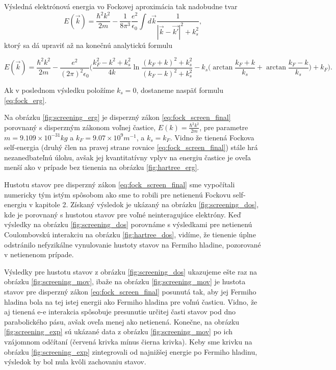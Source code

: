 Výsledná elektrónová energia vo Fockovej aproximácia tak nadobudne tvar
 \begin{equation}
  \label{eq:fock_screen}
  E(\vec{k})=\frac{\hbar^2 k^2}{2m} - \frac{1}{8\pi^3}  \frac{e^2}{\epsilon_0}  \int d\vec{k} \frac{1}{|\vec{k}-\vec{k'}|^2+k_s^2} \text{,}
 \end{equation}
 ktorý sa dá upraviť až na konečnú analytickú formulu
 
 
 
 
 
 

 \begin{equation}
  \label{eq:fock_screen_final}
  E(\vec{k})=\frac{\hbar^2 k^2} {2m} - \frac{e^2}{(2\pi)^2\epsilon_0} \biggl(
    \frac{k_F^2-k^2+k_s^2}{4k} \ln{\frac{(k_F+k)^2+k_s^2}{(k_F-k)^2+k_s^2}}-k_s\bigl(\arctan{\frac{k_F+k}{k_s}}+\arctan{\frac{k_F-k}{k_s}}\bigr)+k_F\biggr) \text{.}
 \end{equation}
 
 
 
 
 Ak v poslednom výsledku položíme $k_s = 0$, dostaneme naspäť formulu \eqref{eq:fock_erg}.

 Na obrázku \ref{fig:screening_erg} je disperzný zákon \eqref{eq:fock_screen_final} porovnaný s disperzným zákonom voľnej častice,
 $E(k)=\frac{\hbar^2 k^2}{2m}$, pre parametre $m = 9.109 \times 10^{-31} kg$ a $k_F = 9.07 \times 10^{9} m^{-1}$, a $k_s = k_F$. Vidno že tienená Fockova self-energia (druhý člen na pravej strane rovnice \ref{eq:fock_screen_final}) stále hrá nezanedbateľnú úlohu, avšak jej kvantitatívny vplyv na energiu častice je oveľa menší ako
 v prípade bez tienenia na obrázku \ref{fig:hartree_erg}.

 Hustotu stavov pre disperzný zákon \eqref{eq:fock_screen_final} sme vypočítali numericky tým istým spôsobom ako sme to robili
 pre netienenú Fockovu self-energiu v kapitole 2. Získaný výsledok je ukázaný na obrázku \ref{fig:screening_dos}, kde je porovnaný
 s hustotou stavov pre voľné neinteragujúce elektróny. Keď výsledky na obrázku \ref{fig:screening_dos} porovnáme s výsledkami pre netienenú Coulombovskú interakciu na obrázku
  \ref{fig:hartree_dos}, vidíme, že tienenie úplne odstránilo nefyzikálne vynulovanie hustoty stavov na Fermiho hladine, pozorované v netienenom prípade.


Výsledky pre hustotu stavov  z obrázku \ref{fig:screening_dos} ukazujeme ešte raz na obrázku \ref{fig:screening_mov},
ibaže na obrázku \ref{fig:screening_mov} je hustota stavov pre disperzný zákon \eqref{eq:fock_screen_final} posunutá tak,
aby jej Fermiho hladina bola na tej istej energii ako Fermiho hladina pre voľnú časticu. Vidno, že aj tienená e-e interakcia spôsobuje presunutie určitej časti stavov
pod dno parabolického pásu, avšak oveľa menej ako netienená. Konečne, na obrázku \ref{fig:screening_exp} sú ukázané data z obrázku
\ref{fig:screening_mov} po ich vzájomnom odčítaní (červená krivka mínus čierna krivka).
Keby sme krivku na obrázku \ref{fig:screening_exp}  zintegrovali od najnižšej energie po Fermiho hladinu, výsledok by bol nula kvôli zachovaniu stavov.

